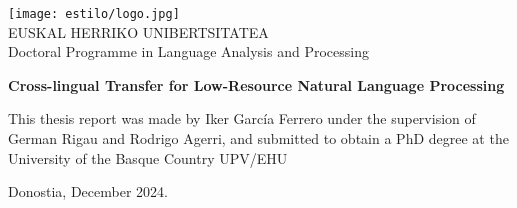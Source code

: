 \thispagestyle{empty}

\begin{center}
  \texttt{[image: estilo/logo.jpg]} \\[0.3cm]
  \textsf{EUSKAL HERRIKO UNIBERTSITATEA}\\[0.15cm]
   \textsf{Doctoral Programme in Language Analysis and Processing}\\[2cm]

\vspace{1cm}
{ \LARGE 
\begin{spacing}{1}
\textbf{\fontsize{19}{22} \selectfont Cross-lingual Transfer for Low-Resource Natural Language Processing}
\end{spacing}
}

\vspace{2.5cm}
\end{center}

\hspace{5cm}
\begin{minipage}{8.1cm}
This thesis report was made by Iker García Ferrero under the supervision of German Rigau and Rodrigo Agerri, and submitted to obtain a PhD degree at the University of the Basque Country UPV/EHU\\
\vspace{0.5cm}

\noindent Donostia, December 2024.

\end{minipage}